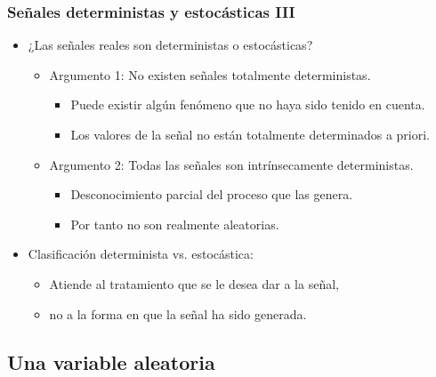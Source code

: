 \documentclass{beamer}
\numberwithin{section}{part}
\begin{document}
\begin{frame}
  \frametitle{Señales deterministas y estocásticas III}
  \begin{itemize}
      \item ¿Las señales reales son deterministas o estocásticas?
      \vspace{0.1cm}
      \begin{itemize}\footnotesize
          \item \alert{Argumento 1:} No existen señales totalmente deterministas.
          \begin{itemize}\scriptsize
              \item Puede existir algún fenómeno que no haya sido tenido en cuenta.
              \item Los valores de la señal no están totalmente determinados a priori.
          \end{itemize}
          \item \alert{Argumento 2:} Todas las señales son intrínsecamente deterministas.
          \begin{itemize}\scriptsize
              \item Desconocimiento parcial del proceso que las genera. 
              \item Por tanto no son realmente aleatorias.
          \end{itemize}
      \end{itemize}
      \vspace{0.1cm}
      \item Clasificación \alert{determinista} vs. \alert{estocástica}:
      \vspace{0.1cm}
      \begin{itemize}\footnotesize
          \item Atiende al tratamiento que se le desea dar a la señal,
          \vspace{0.1cm}
          \item no a la forma en que la señal ha sido generada.
      \end{itemize}
  \end{itemize}
\end{frame}

\subsection{Una variable aleatoria}
\end{document}

